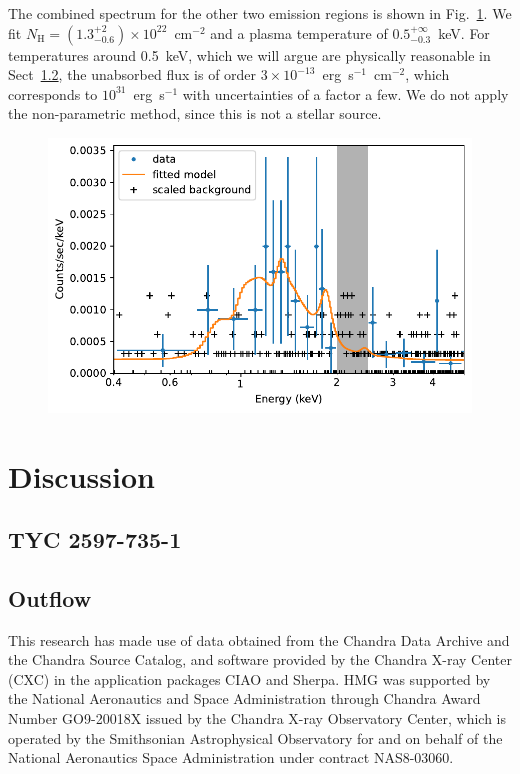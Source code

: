 \documentclass[linenumbers]{aastex631}
\begin{document}
The combined spectrum for the other two emission regions is shown in Fig.~\ref{fig:combined}. We fit $N_\mathrm{H}=(1.3_{-0.6}^{+2})\times10^{22}$~cm$^{-2}$ and a plasma temperature of $0.5_{-0.3}^{+\infty}$~keV. For temperatures around 0.5~keV, which we will argue are physically reasonable in Sect~\ref{sec:outflow}, the unabsorbed flux is of order $3 \times 10^{-13}$~erg~s$^{-1}$~cm$^{-2}$, which corresponds to $10^{31}$~erg~s$^{-1}$ with uncertainties of a factor a few. We do not apply the non-parametric method, since this is not a stellar source.
\begin{figure}
    \centering
    \includegraphics[width=\textwidth]{figures/combined.pdf}
    \caption{}
    \label{fig:combined}
\end{figure}

\section{Discussion}  \label{sec:discussion}
\subsection{TYC 2597-735-1}

\subsection{Outflow} \label{sec:outflow}

\begin{acknowledgements}
This research has made use of data obtained from the Chandra Data Archive and the Chandra Source Catalog, and software provided by the Chandra X-ray Center (CXC) in the application packages CIAO and Sherpa. 
HMG was supported by the National Aeronautics and Space Administration through Chandra Award Number GO9-20018X issued by the Chandra X-ray Observatory Center, which is operated by the Smithsonian Astrophysical Observatory for and on behalf of the National Aeronautics Space Administration under contract NAS8-03060.
\end{acknowledgements}
\end{document}
